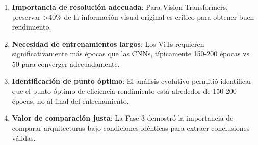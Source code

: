 \begin{enumerate}
    \item \textbf{Importancia de resolución adecuada}: Para Vision Transformers, preservar >40\% de la información visual original es crítico para obtener buen rendimiento.
    
    \item \textbf{Necesidad de entrenamientos largos}: Los ViTs requieren significativamente más épocas que las CNNs, típicamente 150-200 épocas vs 50 para converger adecuadamente.
    
    \item \textbf{Identificación de punto óptimo}: El análisis evolutivo permitió identificar que el punto óptimo de eficiencia-rendimiento está alrededor de 150-200 épocas, no al final del entrenamiento.
    
    \item \textbf{Valor de comparación justa}: La Fase 3 demostró la importancia de comparar arquitecturas bajo condiciones idénticas para extraer conclusiones válidas.
\end{enumerate}
